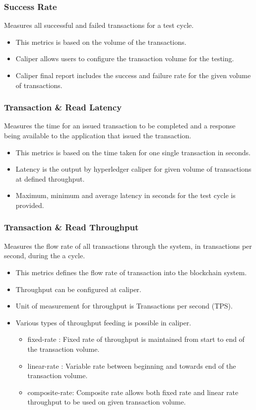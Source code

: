 \documentclass{ceadar_article}
\begin{document}
\subsubsection{Success Rate} 
Measures all successful and failed transactions for a test cycle.
\begin{itemize}
    \item This metrics is based on the volume of the transactions.
    \item Caliper allows users to configure the transaction volume for the testing.
    \item Caliper final report includes the success and failure rate for the given volume of transactions.
\end{itemize}


\subsubsection{Transaction \& Read Latency} 
Measures the time for an issued transaction to be completed and a response being available to the application that issued the transaction. 

\begin{itemize}
    \item This metrics is based on the time taken for one single transaction in seconds.
    \item Latency is the output by hyperledger caliper for given volume of transactions at defined throughput.
    \item Maximum, minimum and average latency in seconds for the test cycle is provided.
\end{itemize}

\subsubsection{Transaction \& Read Throughput} 
Measures the flow rate of all transactions through the system, in transactions per second, during the a cycle. 
\begin{itemize}
    \item This metrics defines the flow rate of transaction into the blockchain system.
    \item Throughput can be configured at caliper.
    \item Unit of measurement for throughput is Transactions per second (TPS).
    \item Various types of throughput feeding is possible in caliper.
    \begin{itemize}
       \item fixed-rate : Fixed rate of throughput is maintained from start to end of the transaction volume.
       \item linear-rate : Variable rate between beginning and towards end of the transaction volume.
       \item composite-rate: Composite rate allows both fixed rate and linear rate throughput to be used on given transaction volume.
     \end{itemize}
   
\end{itemize}
\end{document}

